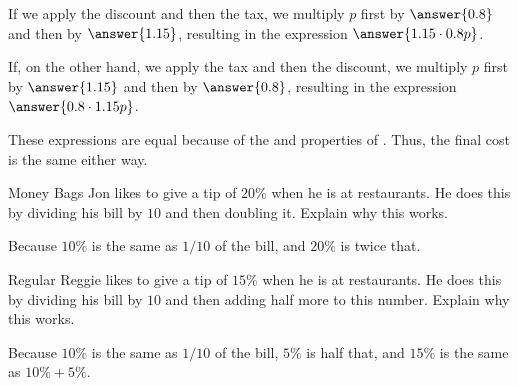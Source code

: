 \documentclass[nooutcomes]{ximera}
\begin{document}
\begin{problem}
\begin{problem}
\begin{problem}
\begin{problem}
If we apply the discount and then the tax, we multiply $p$ first by $\answer{0.8}$ and then by $\answer{1.15}$, resulting in the expression $\answer{1.15\cdot 0.8p}$. 

If, on the other hand, we apply the tax and then the discount, we multiply $p$ first by $\answer{1.15}$ and then by $\answer{0.8}$, resulting in the expression $\answer{0.8\cdot 1.15p}$. 

These expressions are equal because of the  and  properties of .  Thus, the final cost is the same either way. 
\end{problem}
\end{problem} 
\end{problem}
\end{problem}


\begin{problem}Money Bags Jon likes to give a tip of $20$\% when he is at
  restaurants. He does this by dividing his bill by $10$ and then
  doubling it. Explain why this works.
\begin{freeResponse}
\begin{hint}
Because $10\%$ is the same as $1/10$ of the bill, and $20\%$ is twice that.  
\end{hint}
\end{freeResponse}
\end{problem} 

\begin{problem}Regular Reggie likes to give a tip of $15$\% when he is at
  restaurants. He does this by dividing his bill by $10$ and then
  adding half more to this number. Explain why this works.
\begin{freeResponse}
\begin{hint}
Because $10\%$ is the same as $1/10$ of the bill, $5\%$ is half that, and $15\%$ is the same as $10\% + 5\%$.  
\end{hint}
\end{freeResponse}
\end{problem} 
\end{document}
